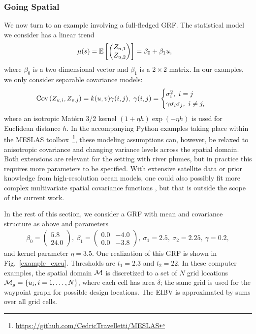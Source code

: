 \documentclass[aoas]{imsart}
\begin{document}
\subsubsection{Going Spatial}
\label{sec:including_spatiality}

We now turn to an example involving a full-fledged GRF. The statistical model we consider has a linear trend
\begin{align*}
\mu(s)=\mathbb{E}\left[\begin{pmatrix}
Z_{\spatloc, 1}\\ Z_{\spatloc, 2}
\end{pmatrix}\right] &= \beta_0 + \beta_1 \spatloc,
\end{align*}
where $\beta_0$ is a two dimensional vector and $\beta_1$ is a $2\times 2$ matrix. In our examples, we only consider separable covariance models:
\begin{align*}
\textrm{Cov}\left(Z_{\spatloc, i}, Z_{v, j}\right) &= k(\spatloc, v) \gamma(i, j),~ \gamma(i, j) = \begin{cases} \sigma_i^2,~ i=j\\
   \gamma \sigma_i \sigma_j,~i\neq j,
        \end{cases}
\end{align*}
where an isotropic Mat\'{e}rn 3/2 kernel $(1+\eta h)\exp (-\eta h)$ is
used for Euclidean distance $h$.  In the accompanying Python examples
taking place within the MESLAS
toolbox~\footnote{\url{https://github.com/CedricTravelletti/MESLAS}},
these modeling assumptions can, however, be relaxed to anisotropic
covariance and changing variance levels across the spatial
domain. Both extensions are relevant for the setting with river
plumes, but in practice this requires more parameters to be
specified. With extensive satellite data or prior knowledge from
high-resolution ocean models, one could also possibly fit more complex
multivariate spatial covariance functions
\citep{gneiting2010matern,genton2015cross}, but that is outside the
scope of the current work.

In the rest of this section, we consider a GRF with mean and
covariance structure as above and parameters
\begin{align*}
\beta_0 = \begin{pmatrix}
5.8\\ 24.0
\end{pmatrix}, ~ \beta_1 = \begin{pmatrix}
0.0 & -4.0\\
0.0 & -3.8
\end{pmatrix},~ \sigma_1 = 2.5,~ \sigma_2 = 2.25, ~ \gamma = 0.2,
\end{align*}
and kernel parameter $\eta=3.5$.
One realization of this GRF is shown in Fig.~\ref{example_excu}. Thresholds are $t_1=2.3$ and $t_2=22$.
In these computer examples, the spatial domain $\mathcal{M}$ is
discretized to a set of $N$ grid locations
$\mathcal{M}_g = \{u_i, i=1,\ldots,N \}$, where each cell has area
$\delta$; the same grid is used for the waypoint graph for possible
design locations. The EIBV is approximated by sums over all grid
cells. 
\end{document}
